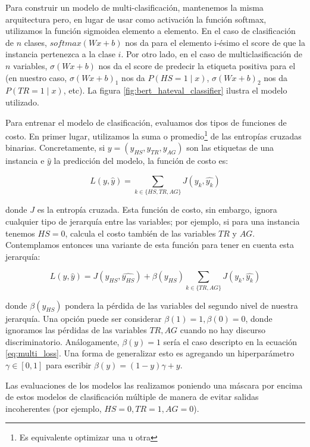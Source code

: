 Para construir un modelo de multi-clasificación, mantenemos la misma arquitectura pero, en lugar de usar como activación la función softmax, utilizamos la función sigmoidea elemento a elemento. En el caso de clasificación de $n$ clases, $softmax(W x + b)$ nos da para el elemento i-ésimo el score de que la instancia pertenezca a la clase $i$. Por otro lado, en el caso de multiclasificación de $n$ variables, $\sigma(W x + b)$ nos da el score de predecir la etiqueta positiva para el (en nuestro caso,  $\sigma(W x + b)_1$ nos da $P( HS = 1 \mid x)$,  $\sigma(W x + b)_2$ nos da  $P(TR = 1 \mid x)$, etc). La figura \ref{fig:bert_hateval_classifier} ilustra el modelo utilizado.

Para entrenar el modelo de clasificación, evaluamos dos tipos de funciones de costo. En primer lugar, utilizamos la suma o promedio\footnote{Es equivalente optimizar una u otra} de las entropías cruzadas binarias. Concretamente, si $y = (y_{HS}, y_{TR}, y_{AG})$ son las etiquetas de una instancia e $\widehat{y}$ la predicción del modelo, la función de costo es:

\begin{equation}
\label{eq:multi_loss}
L(y, \widehat{y}) = \sum\limits_{k \in \{HS, TR, AG\}} J(y_k, \widehat{y_k})
\end{equation}

donde $J$ es la entropía cruzada. Esta función de costo, sin embargo, ignora cualquier tipo de jerarquía entre las variables; por ejemplo, si para una instancia tenemos $HS = 0$, calcula el costo también de las variables $TR$ y $AG$. Contemplamos entonces una variante de esta función para tener en cuenta esta jerarquía:

\begin{equation}
    \label{eq:hierarchical_loss}
    L(y, \widehat{y}) =  J(y_{HS}, \widehat{y_{HS}}) + \beta(y_{HS})\sum\limits_{k \in \{TR, AG\}} J(y_k, \widehat{y_k})
\end{equation}

donde $\beta(y_{HS})$ pondera la pérdida de las variables del segundo nivel de nuestra jerarquía. Una opción puede ser considerar $\beta(1) = 1, \beta(0) = 0$, donde ignoramos las pérdidas de las variables $TR, AG$ cuando no hay discurso discriminatorio. Análogamente, $\beta(y) = 1$ sería el caso descripto en la ecuación \ref{eq:multi_loss}. Una forma de generalizar esto es agregando un hiperparámetro $\gamma \in [0, 1]$ para escribir $\beta(y) = (1-y) \gamma + y$.

Las evaluaciones de los modelos las realizamos poniendo una máscara por encima de estos modelos de clasificación múltiple de manera de evitar salidas incoherentes (por ejemplo, $HS = 0, TR = 1, AG= 0$).


